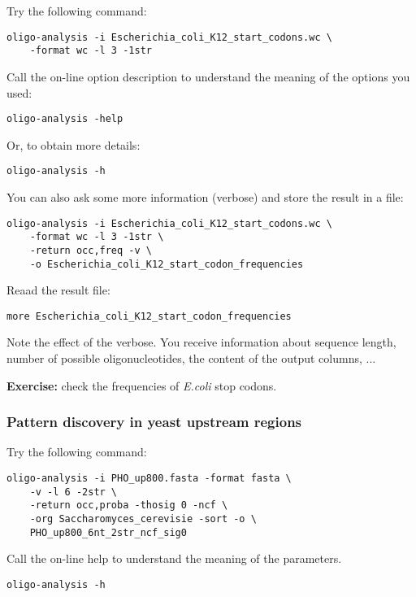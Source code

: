 Try the following command:

\begin{verbatim}
oligo-analysis -i Escherichia_coli_K12_start_codons.wc \
    -format wc -l 3 -1str
\end{verbatim}

Call the on-line option description to understand the meaning of the options you used:
\begin{verbatim}
oligo-analysis -help
\end{verbatim}

Or, to obtain more details:
\begin{verbatim}
oligo-analysis -h
\end{verbatim}


You can also ask some more information (verbose) and store the result
in a file:

\begin{verbatim}
oligo-analysis -i Escherichia_coli_K12_start_codons.wc \
    -format wc -l 3 -1str \
    -return occ,freq -v \
    -o Escherichia_coli_K12_start_codon_frequencies
\end{verbatim}

Reaad the result file:

\begin{verbatim}
more Escherichia_coli_K12_start_codon_frequencies
\end{verbatim}

Note the effect of the verbose. You receive information about sequence
length, number of possible oligonucleotides, the content of the output
columns, ...

\textbf{Exercise:} check the frequencies of \textit{E.coli} stop codons.

\subsubsection{Pattern discovery in yeast upstream regions}

Try the following command:

\begin{verbatim} 
oligo-analysis -i PHO_up800.fasta -format fasta \
    -v -l 6 -2str \
    -return occ,proba -thosig 0 -ncf \
    -org Saccharomyces_cerevisie -sort -o \
    PHO_up800_6nt_2str_ncf_sig0 
\end{verbatim}

Call the on-line help to understand the meaning of the parameters.

\begin{verbatim} 
oligo-analysis -h
\end{verbatim}

